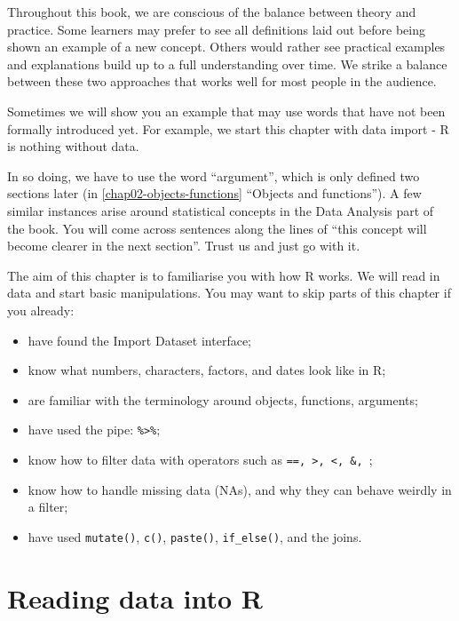 \documentclass[
  12pt,
  krantz2]{krantz}
\providecommand{\tightlist}{%
  \setlength{\itemsep}{0pt}\setlength{\parskip}{0pt}}
\begin{document}
Throughout this book, we are conscious of the balance between theory and practice.
Some learners may prefer to see all definitions laid out before being shown an example of a new concept.
Others would rather see practical examples and explanations build up to a full understanding over time.
We strike a balance between these two approaches that works well for most people in the audience.

Sometimes we will show you an example that may use words that have not been formally introduced yet.
For example, we start this chapter with data import - R is nothing without data.

In so doing, we have to use the word ``argument'', which is only defined two sections later (in \ref{chap02-objects-functions} ``Objects and functions'').
A few similar instances arise around statistical concepts in the Data Analysis part of the book.
You will come across sentences along the lines of ``this concept will become clearer in the next section''.
Trust us and just go with it.

The aim of this chapter is to familiarise you with how R works.
We will read in data and start basic manipulations. You may want to skip parts of this chapter if you already:

\begin{itemize}
\tightlist
\item
  have found the Import Dataset interface;
\item
  know what numbers, characters, factors, and dates look like in R;
\item
  are familiar with the terminology around objects, functions, arguments;
\item
  have used the pipe: \texttt{\%\textgreater{}\%};
\item
  know how to filter data with operators such as \texttt{==,\ \textgreater{},\ \textless{},\ \&,\ \textbar{}};
\item
  know how to handle missing data (NAs), and why they can behave weirdly in a filter;
\item
  have used \texttt{mutate()}, \texttt{c()}, \texttt{paste()}, \texttt{if\_else()}, and the joins.
\end{itemize}

\hypertarget{chap02-h2-reading-data-into-r}{%
\section{Reading data into R}\label{chap02-h2-reading-data-into-r}}
\end{document}
